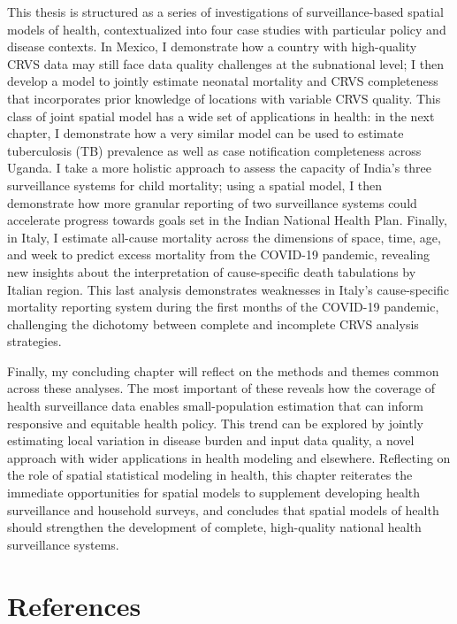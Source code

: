 \documentclass[
]{article}
\begin{document}
This thesis is structured as a series of investigations of surveillance-based spatial models of health, contextualized into four case studies with particular policy and disease contexts. In Mexico, I demonstrate how a country with high-quality CRVS data may still face data quality challenges at the subnational level; I then develop a model to jointly estimate neonatal mortality and CRVS completeness that incorporates prior knowledge of locations with variable CRVS quality. This class of joint spatial model has a wide set of applications in health: in the next chapter, I demonstrate how a very similar model can be used to estimate tuberculosis (TB) prevalence as well as case notification completeness across Uganda. I take a more holistic approach to assess the capacity of India's three surveillance systems for child mortality; using a spatial model, I then demonstrate how more granular reporting of two surveillance systems could accelerate progress towards goals set in the Indian National Health Plan. Finally, in Italy, I estimate all-cause mortality across the dimensions of space, time, age, and week to predict excess mortality from the COVID-19 pandemic, revealing new insights about the interpretation of cause-specific death tabulations by Italian region. This last analysis demonstrates weaknesses in Italy's cause-specific mortality reporting system during the first months of the COVID-19 pandemic, challenging the dichotomy between complete and incomplete CRVS analysis strategies.

Finally, my concluding chapter will reflect on the methods and themes common across these analyses. The most important of these reveals how the coverage of health surveillance data enables small-population estimation that can inform responsive and equitable health policy. This trend can be explored by jointly estimating local variation in disease burden and input data quality, a novel approach with wider applications in health modeling and elsewhere. Reflecting on the role of spatial statistical modeling in health, this chapter reiterates the immediate opportunities for spatial models to supplement developing health surveillance and household surveys, and concludes that spatial models of health should strengthen the development of complete, high-quality national health surveillance systems.

\hypertarget{references}{%
\section{References}\label{references}}
\end{document}
